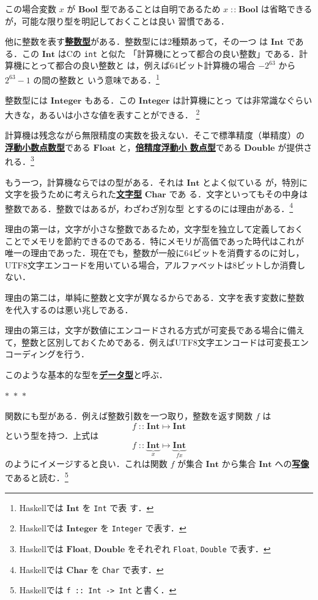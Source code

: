 \documentclass[a5paper,twoside,fleqn,draft]{jsbook}
\newcommand{\separator}{\begin{center}$*$~$*$~$*$\end{center}}
\newcommand{\programminglanguage}[1]{\textsf{#1}}
\newcommand{\clang}{\programminglanguage{C}}
\newcommand{\haskell}{\programminglanguage{Haskell}}
\newcommand{\keyword}[1]{{\underline{\textbf{#1}}}}
\newcommand{\code}[1]{\texttt{#1}}
\DeclareMathOperator{\mFuncArrow}{\mapsto}
\DeclareMathOperator{\mIn}{{:\!:}}
\newcommand{\mType}[1]{\mathbf{#1}} %
\newcommand{\mBoolType}{\mType{Bool}}
\newcommand{\mCharType}{\mType{Char}}
\newcommand{\mFloatType}{\mType{Float}}
\newcommand{\mDoubleType}{\mType{Double}}
\newcommand{\mIntType}{\mType{Int}}
\newcommand{\mIntegerType}{\mType{Integer}}
\begin{document}
この場合変数 $x$ が $\mBoolType$ 型であることは自明であるため
$x\mIn\mBoolType$ は省略できるが，可能な限り型を明記しておくことは良い
習慣である．

他に整数を表す\keyword{整数型}がある．整数型には2種類あって，その一つ
は $\mIntType$ である．この $\mIntType$ は\clang の \code{int} と似た
「計算機にとって都合の良い整数」である．計算機にとって都合の良い整数と
は，例えば64ビット計算機の場合 $-2^{63}$ から $2^{63}-1$ の間の整数と
いう意味である．\footnote{\haskell では $\mIntType$ を \code{Int} で表
  す．}

整数型には $\mIntegerType$ もある．この $\mIntegerType$ は計算機にとっ
ては非常識なぐらい大きな，あるいは小さな値を表すことができる．
\footnote{\haskell では $\mIntegerType$ を \code{Integer} で表す．}

計算機は残念ながら無限精度の実数を扱えない．そこで標準精度（単精度）の
\keyword{浮動小数点数型}である $\mFloatType$ と，\keyword{倍精度浮動小
  数点型}である $\mDoubleType$ が提供される．\footnote{\haskell では
  $\mFloatType$, $\mDoubleType$ をそれぞれ \code{Float}, \code{Double}
  で表す．}

もう一つ，計算機ならではの型がある．それは $\mIntType$ とよく似ている
が，特別に文字を扱うために考えられた\keyword{文字型} $\mCharType$ であ
る．文字といってもその中身は整数である．整数ではあるが，わざわざ別な型
とするのには理由がある．\footnote{\haskell では $\mCharType$ を
  \code{Char} で表す．}

理由の第一は，文字が小さな整数であるため，文字型を独立して定義しておく
ことでメモリを節約できるのである．特にメモリが高価であった時代はこれが
唯一の理由であった．現在でも，整数が一般に64ビットを消費するのに対し，
UTF8文字エンコードを用いている場合，アルファベットは8ビットしか消費し
ない．

理由の第二は，単純に整数と文字が異なるからである．文字を表す変数に整数
を代入するのは悪い兆しである．

理由の第三は，文字が数値にエンコードされる方式が可変長である場合に備え
て，整数と区別しておくためである．例えばUTF8文字エンコードは可変長エン
コーディングを行う．

このような基本的な型を\keyword{データ型}と呼ぶ．

\separator

関数にも型がある．例えば整数引数を一つ取り，整数を返す関数 $f$ は
\begin{equation}
  f
  \mIn\mIntType
  \mFuncArrow\mIntType
\end{equation}
という型を持つ．上式は
\begin{equation}
  f
  \mIn\underbrace{\mIntType}_{x}
  \mFuncArrow\underbrace{\mIntType}_{fx}
\end{equation}
のようにイメージすると良い．これは関数 $f$ が集合 $\mIntType$ から集合
$\mIntType$ への\keyword{写像}であると読む．\footnote{\haskell では
  \code{f :: Int -> Int} と書く．}
\end{document}
